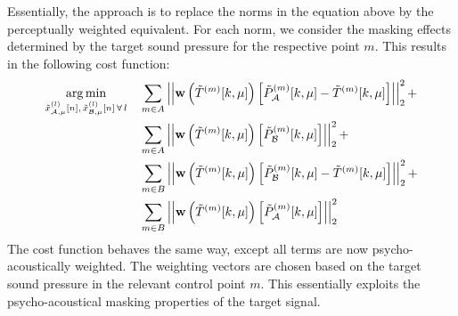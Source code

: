 Essentially, the approach is to replace the norms in the equation above by the perceptually weighted equivalent.
For each norm, we consider the masking effects determined by the target sound pressure for the respective point $m$. 
This results in the following cost function:
\begin{align}
    \argmin{\tilde{x}_{\za,\mu}^{(l)}[n],\,\tilde{x}_{\zb,\mu}^{(l)}[n]\,\forall\,l}{
       &\sum_{m\in A} \norm[2][2]{
        \vec{w}\left(\tilde{T}^{(m)}[k,\mu]\right)\left[\tilde{P}_{\za}^{(m)}[k,\mu] - \tilde{T}^{(m)}[k,\mu]\right]} + \\
       &\sum_{m\in A} \norm[2][2]{\vec{w}\left(\tilde{T}^{(m)}[k,\mu]\right)
        \left[\tilde{P}_{\zb}^{(m)}[k,\mu]\right]} + \\
       &\sum_{m\in B} \norm[2][2]{\vec{w}\left(\tilde{T}^{(m)}[k,\mu]\right)
        \left[\tilde{P}_{\zb}^{(m)}[k,\mu] - \tilde{T}^{(m)}[k,\mu]\right]} + \\
       &\sum_{m\in B} \norm[2][2]{\vec{w}\left(\tilde{T}^{(m)}[k,\mu]\right)
        \left[\tilde{P}_{\za}^{(m)}[k,\mu]\right]}
    }
\end{align}
The cost function behaves the same way, except all terms are now psycho-acoustically weighted.
The weighting vectors are chosen based on the target sound pressure in the relevant control point $m$.
This essentially exploits the psycho-acoustical masking properties of the target signal.
